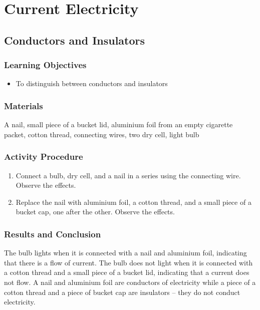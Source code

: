 \section{Current Electricity}

\subsection{Conductors and Insulators}

\subsubsection*{Learning Objectives}
\begin{itemize}
\item{To distinguish between conductors and insulators} 
\end{itemize}

\subsubsection*{Materials}
A nail, small piece of a bucket lid, aluminium foil from an empty cigarette packet, cotton thread, connecting wires, two dry cell, light bulb


\subsubsection*{Activity Procedure}
\begin{enumerate}
\item{Connect a bulb, dry cell, and a nail in a series using the connecting wire. Observe the effects.} 
\item{Replace the nail with aluminium foil, a cotton thread, and a small piece of a bucket cap, one after the other. Observe the effects.} 
\end{enumerate}

\subsubsection*{Results and Conclusion}
The bulb lights when it is connected with a nail and aluminium foil, indicating that there is a flow of current. The bulb does not light when it is connected with a cotton thread and a small piece of a bucket lid, indicating that a current does not flow. A nail and aluminium foil are conductors of electricity while a piece of a cotton thread and a piece of bucket cap are insulators -- they do not conduct electricity.


